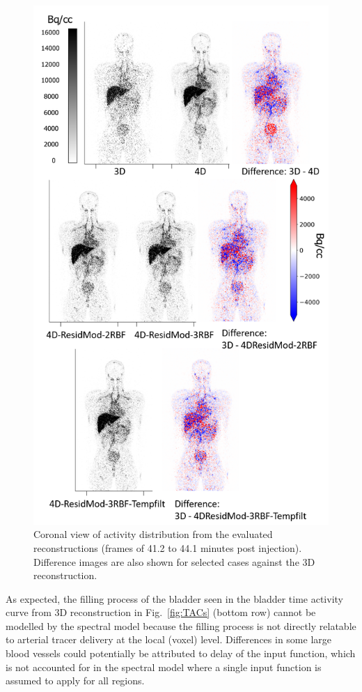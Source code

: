 \begin{figure} [!ht]
\centering
\includegraphics[scale=1.15, angle=0]{3_Results/3_4_Residual/figures/Frame14DifferencesV2.png}
\caption{Coronal view of activity distribution from the evaluated reconstructions (frames of 41.2 to 44.1 minutes post injection). Difference images are also shown for selected cases against the 3D reconstruction.}
\label{fig:Frame14Differences}
\end{figure}

As expected, the filling process of the bladder seen in the bladder time activity curve from 3D reconstruction in Fig.~\ref{fig:TACs} (bottom row) cannot be modelled by the spectral model because the filling process is not directly relatable to arterial tracer delivery at the local (voxel) level. Differences in some large blood vessels could potentially be attributed to delay of the input function, which is not accounted for in the spectral model where a single input function is assumed to apply for all regions. 

